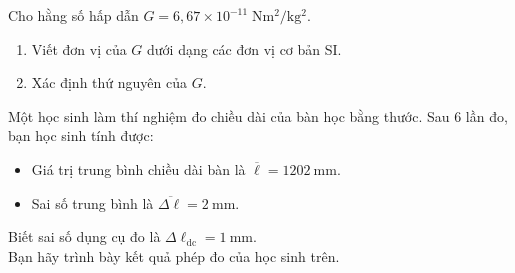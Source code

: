 \begin{ex}
	Cho hằng số hấp dẫn \(G = 6{,}67\times10^{-11}\;\si{\newton\meter^{2}\per\kilogram^{2}}\).
	\begin{enumerate}[label=\alph*)]
		\item Viết đơn vị của \(G\) dưới dạng các đơn vị cơ bản SI.
		\item Xác định thứ nguyên của \(G\).
	\end{enumerate}
\end{ex}

\begin{ex}
	Một học sinh làm thí nghiệm đo chiều dài của bàn học bằng thước. Sau 6 lần đo, bạn học sinh tính được:
	\begin{itemize}
		\item Giá trị trung bình chiều dài bàn là $\overline{\ell}=\SI{1202}{\milli\meter}$.
		\item Sai số trung bình là $\overline{\Delta\ell}=\SI{2}{\milli\meter}$.
	\end{itemize}
	Biết sai số dụng cụ đo là $\Delta \ell_\text{dc}=\SI{1}{\milli\meter}$.\\
	Bạn hãy trình bày kết quả phép đo của học sinh trên.
\end{ex}

